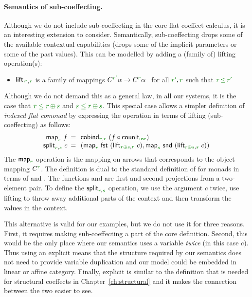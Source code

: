 \paragraph{Semantics of sub-coeffecting.}
Although we do not include sub-coeffecting in the core flat coeffect calculus, it is an interesting 
extension to consider. Semantically, sub-coeffecting drops some of the available contextual 
capabilities (drops some of the implicit parameters or some of the past values). This can be
modelled by adding a (family of) lifting operation(s):
%
\begin{itemize}
 \item $\ident{lift}_{\cclrd{r'},\cclrd{r}}$ is a family of mappings
   $\ctyp{\cclrd{r'}}{\alpha} \rightarrow \ctyp{\cclrd{r}}{\alpha}$~ for all $\cclrd{r'}, \cclrd{r}$ such that $\cclrd{r}\,\cleq\,\cclrd{r'}$
\end{itemize}
%
Although we do not demand this as a general law, in all our systems, it is the case that
$\cclrd{r} \;\cleq\; \cclrd{r}\,\cpar\,\cclrd{s}$ and $\cclrd{s} \;\cleq\; \cclrd{r}\,\cpar\,\cclrd{s}$.
This special case allows a simpler definition of \emph{indexed flat comonad} by expressing the 
 operation in terms of lifting (sub-coeffecting) as follows:
%
\begin{equation*}
\begin{array}{rcl}
\ident{map}_{\cclrd{r}}~f &\narrow{=}& \ident{cobind}_{\cclrd{r}, \cclrd{r}}~(f\circ\ident{counit}_{\cunit}) \\
\ident{split}_{\cclrd{r}, \cclrd{s}}~c &\narrow{=}&
  ( \ident{map}_{\cclrd{r}}~\ident{fst}~(\ident{lift}_{\cclrd{r}\cpar\cclrd{s}, \cclrd{r}}~c), 
    \ident{map}_{\cclrd{s}}~\ident{snd}~(\ident{lift}_{\cclrd{r}\cpar\cclrd{s}, \cclrd{s}}~c) )
\end{array}
\end{equation*}
%
The $\ident{map}_{\cclrd{r}}$ operation is the mapping on arrows that corresponds to the object 
mapping $\ctyp{\cclrd{r}}{}$. The definition is dual to the standard definition of  
for monads in terms of  and . The functions  and 
are first and second projections from a two-element pair. To define the 
$\ident{split}_{\cclrd{r}, \cclrd{s}}$ operation, we use the argument $c$ twice, use lifting
to throw away additional parts of the context and then transform the values in the 
context.

This alternative is valid for our examples, but we do not use it for three reasons. First, it
requires making sub-coeffecting a part of the core definition. Second, this would be the only 
place where our semantics uses a variable \emph{twice} (in this case $c$). Thus using an explicit 
 means that the structure required by our semantics does not need to provide variable 
duplication and our model could be embedded in linear or affine category. Finally, explicit 
 is similar to the definition that is needed for structural coeffects in 
Chapter~\ref{ch:structural} and it makes the connection between the two easier to see.

